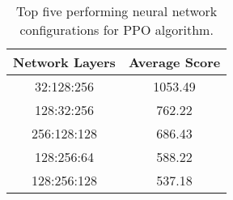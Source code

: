 \begin{table}[h]
    \centering
    \begin{tabular}{|c|c|}
    \hline
    \textbf{Network Layers} & \textbf{Average Score} \\
    \hline
    \hline
    32:128:256 & 1053.49 \\
    \hline
    128:32:256 & 762.22 \\
    \hline
    256:128:128 & 686.43 \\
    \hline
    128:256:64 & 588.22 \\
    \hline
    128:256:128 & 537.18 \\
    \hline
    \end{tabular}
    \caption{Top five performing neural network configurations for PPO algorithm.}
    \label{tab:ppo_top_nn_configurations}
\end{table}
    
